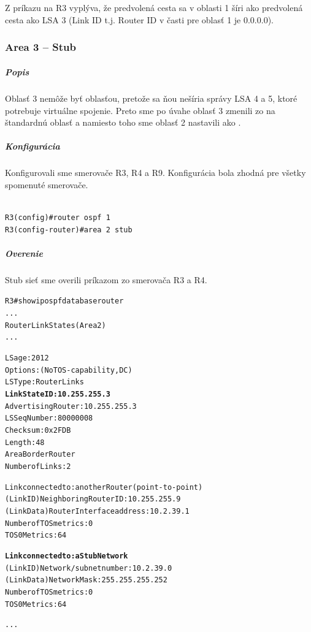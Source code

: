 \documentclass[12pt,twoside,a4paper]{article}
\begin{document}
\subparagraph{}
Z príkazu  na R3 vyplýva, že predvolená cesta sa v oblasti 1 šíri ako predvolená cesta ako LSA 3 (Link ID t.j. Router ID v časti  pre oblasť 1 je 0.0.0.0).

\subsubsection*{Area 3 – Stub}
\subparagraph{Popis}
\subparagraph{}
Oblasť 3 nemôže byť  oblasťou, pretože sa ňou nešíria správy LSA 4 a 5, ktoré potrebuje virtuálne spojenie. Preto sme po úvahe oblasť 3 zmenili zo  na štandardnú oblasť a namiesto toho sme oblasť 2 nastavili ako .

\subparagraph{Konfigurácia}
\subparagraph{}
Konfigurovali sme smerovače R3, R4 a R9. Konfigurácia bola zhodná pre všetky spomenuté smerovače.

\noindent
{\selectfont
\begin{small}
\begin{verbatim}

R3(config)#router ospf 1
R3(config-router)#area 2 stub

\end{verbatim}
\end{small}
}

\subparagraph{Overenie}
\subparagraph{}
Stub sieť sme overili príkazom  zo smerovača R3 a R4.


\noindent
{\selectfont
\begin{small}
\begin{alltt}
R3#show ip ospf database router
...
		Router Link States (Area 2)
...

  LS age: 2012
  Options: (No TOS-capability, DC)
  LS Type: Router Links
  \textbf{Link State ID: 10.255.255.3}
  Advertising Router: 10.255.255.3
  LS Seq Number: 80000008
  Checksum: 0x2FDB
  Length: 48
  Area Border Router
  Number of Links: 2

    Link connected to: another Router (point-to-point)
     (Link ID) Neighboring Router ID: 10.255.255.9
     (Link Data) Router Interface address: 10.2.39.1
      Number of TOS metrics: 0
       TOS 0 Metrics: 64

    \textbf{Link connected to: a Stub Network}
     (Link ID) Network/subnet number: 10.2.39.0
     (Link Data) Network Mask: 255.255.255.252
      Number of TOS metrics: 0
       TOS 0 Metrics: 64

...

\end{alltt}
\end{small}
}
\end{document}
